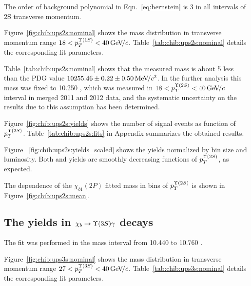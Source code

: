  The order of background polynomial in Eqn.~\ref{eq:bernstein} is 3 in all
 intervals of \Y2S transverse momentum.


Figure~\ref{fig:chib:ups2s:nominal} shows the mass distribution in transverse
momentum range $18 < p_T^{\OneS} < 40 \gevc$. Table~\ref{tab:chib:ups2s:nominal}
details the corresponding fit parameters.




Table~\ref{tab:chib:ups2s:nominal} shows that the measured \chiboneTwoP mass is
about 5 \mevcc less than the PDG value $10255.46  \pm 0.22 \pm 0.50 {\mathrm{\,Me\kern -0.1em V\!/}c^2}$. In
the further analysis this mass was fixed to 10.250 \gevcc, which was measured
in $18 < p_T^{\Y2S} < 40 \gevc$ interval in merged 2011 and 2012 data, and the
systematic uncertainty on the results due to this assumption has been
determined.


Figure~\ref{fig:chib:ups2s:yields} shows the number of signal events as function
of $p_T^{\Y2S}$. Table~\ref{tab:chib:ups2s:fits} in Appendix summarizes the
obtained results.



Figure ~\ref{fig:chib:ups2s:yields_scaled} shows the yields normalized by bin
size and luminosity. Both \chibTwoP and \chibThreeP yields are smoothly
decreasing functions of $p_T^{\Y2S}$, as expected.

The dependence of the $\chi_{b1}(2P)$ fitted mass in bins of $p_T^{\Y2S}$ is
shown in Figure~\ref{fig:chib:ups2s:mean}.



\subsection{The \texorpdfstring{\chib}{chib} yields in
	\texorpdfstring{$\chib \to \Y3S \gamma$}{chib --> Y(3S) gamma} decays}
\label{sec:chib:ups3s:fit}

The fit was performed in the mass interval from  10.440 to 10.760 \gevcc. 

Figure~\ref{fig:chib:ups3s:nominal} shows the mass distribution in transverse
momentum range $27<p_T^{\Y3S}<40\gevc$. Table~\ref{tab:chib:ups3s:nominal}
details the corresponding fit parameters.




